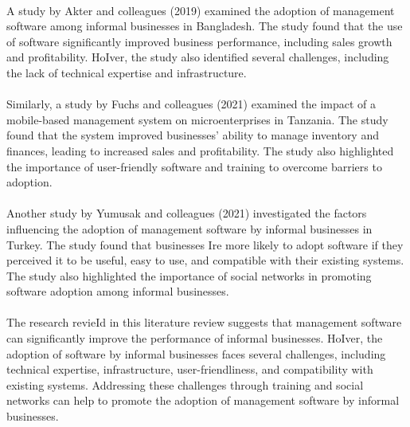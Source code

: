 \documentclass{article}
\begin{document}
\paragraph*{}
A study by Akter and colleagues (2019) examined the adoption of management software among informal businesses in Bangladesh. The study found that the use of software significantly improved business performance, including sales growth and profitability. HoIver, the study also identified several challenges, including the lack of technical expertise and infrastructure.

\paragraph*{}
Similarly, a study by Fuchs and colleagues (2021) examined the impact of a mobile-based management system on microenterprises in Tanzania. The study found that the system improved businesses' ability to manage inventory and finances, leading to increased sales and profitability. The study also highlighted the importance of user-friendly software and training to overcome barriers to adoption.

\paragraph*{}
Another study by Yumusak and colleagues (2021) investigated the factors influencing the adoption of management software by informal businesses in Turkey. The study found that businesses Ire more likely to adopt software if they perceived it to be useful, easy to use, and compatible with their existing systems. The study also highlighted the importance of social networks in promoting software adoption among informal businesses.

\paragraph*{}
The research revieId in this literature review suggests that management software can significantly improve the performance of informal businesses. HoIver, the adoption of software by informal businesses faces several challenges, including technical expertise, infrastructure, user-friendliness, and compatibility with existing systems. Addressing these challenges through training and social networks can help to promote the adoption of management software by informal businesses.


\newpage

\end{document}
